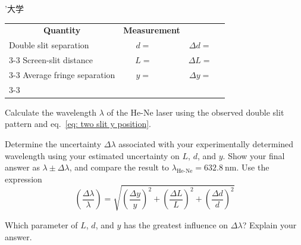 ’大学\documentclass[addpoints]{physlabs}
\begin{document}
\begin{postlab}
    \begin{center}
        \renewcommand{\arraystretch}{2}
        \captionsetup{font=normalsize}
        \begin{tabular}{lc>{\centering\arraybackslash}p{3cm}cp{3cm}}
            \hline
            \multicolumn{1}{c}{\textbf{Quantity}} & \multicolumn{2}{c}{\textbf{Measurement}} & \multicolumn{2}{c}{\textbf{Uncertainty}}
            \\
            Double slit separation & $d=$  & & $\Delta d=$ &
            \\
            \cline{3-3}\cline{5-5}
            Screen-slit distance & $L=$ & & $\Delta L=$ &
            \\
            \cline{3-3}\cline{5-5}
            Average fringe separation & $y=$ & & $\Delta y=$ &
            \\
            \cline{3-3}\cline{5-5}
        \end{tabular}
    \end{center}

    \filbreak
    \question[1] Calculate the wavelength $\lambda$ of the He-Ne laser using the observed double slit pattern and eq.~\ref{eq: two slit y position}.
    \begin{solution}[2cm]
    \end{solution}

    \filbreak
    \question[1] Determine the uncertainty $\Delta\lambda$ associated with your experimentally determined wavelength using your estimated uncertainty on $L$, $d$, and $y$. Show your final answer as $\lambda\pm\Delta\lambda$, and compare the result to $\lambda_\text{He-Ne}=\qty{632.8}{\nano\meter}$. Use the expression
    \begin{equation}
        \left(\frac{\Delta\lambda}{\lambda}\right) = \sqrt{\left(\frac{\Delta y}{y}\right)^2 + \left(\frac{\Delta L}{L}\right)^2 + \left(\frac{\Delta d}{d}\right)^2}
    \end{equation}
    \begin{solution}[6cm]
    \end{solution}

    \filbreak
    \question[1] Which parameter of $L$, $d$, and $y$ has the greatest influence on $\Delta\lambda$? Explain your answer.
    \begin{solution}[2.5cm]
    \end{solution}


\end{postlab}
\end{document}
